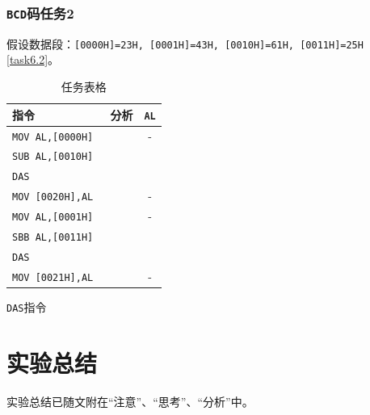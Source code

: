 \documentclass[11pt]{SEU-Digital-Report}
\newcommand{\grayrow}{\rowcolor[rgb]{ .906, .902, .902}}
\begin{document}
\subsubsection{\texttt{BCD}码任务2}
假设数据段：\texttt{[0000H]=23H, [0001H]=43H, [0010H]=61H, [0011H]=25H} \ref{task6.2}。
\begin{table}[htbp]
    \centering
    \caption{任务表格\label{tab:task6.2}}
    \bgroup{}
    \setlength{\tabcolsep}{4.5mm}
        \begin{tabular}{l|c|c}
          \toprule
          \textbf{指令} & \textbf{分析} & \texttt{AL}\\
          \midrule\midrule
          \grayrow  \texttt{MOV AL,[0000H]} & & -\\
                    \texttt{SUB AL,[0010H] } & & \\
          \grayrow  \texttt{DAS} & & \\
                    \texttt{MOV [0020H],AL}& & -\\
          \grayrow  \texttt{MOV AL,[0001H]} & & -\\
                    \texttt{SBB AL,[0011H]} & & \\
          \grayrow  \texttt{DAS} & & \\
                    \texttt{MOV [0021H],AL} & & -\\
          \bottomrule
        \end{tabular}
    \egroup
\end{table}
\begin{analyze}{\texttt{DAS}指令}{}

\end{analyze}

\section{实验总结}
实验总结已随文附在“注意”、“思考”、“分析”中。

\printbibliography
\end{document}
